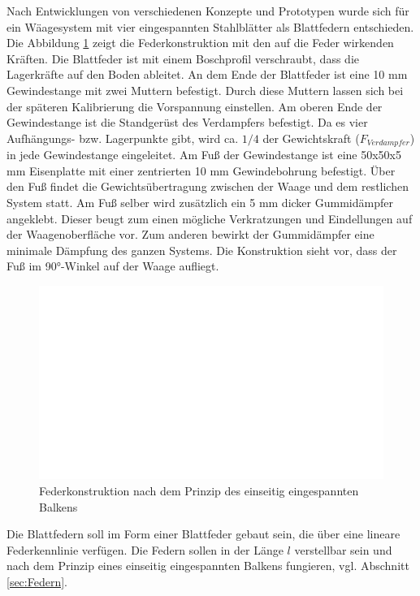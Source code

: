 Nach Entwicklungen von verschiedenen Konzepte und Prototypen wurde sich für ein Wäagesystem mit vier eingespannten Stahlblätter als Blattfedern entschieden.  Die Abbildung \ref{fig:Feder} zeigt die Federkonstruktion mit den auf die Feder wirkenden Kräften. Die Blattfeder ist mit einem Boschprofil verschraubt, dass die Lagerkräfte auf den Boden ableitet. An dem Ende der Blattfeder ist eine 10 mm Gewindestange mit zwei Muttern befestigt. Durch diese Muttern lassen sich bei der späteren Kalibrierung die Vorspannung einstellen. Am oberen Ende der Gewindestange ist die Standgerüst des Verdampfers befestigt. Da es vier Aufhängungs- bzw. Lagerpunkte gibt, wird ca. $1/4$ der Gewichtskraft ($F_{Verdampfer}$) in jede Gewindestange eingeleitet. Am Fuß der Gewindestange ist eine 50x50x5 mm Eisenplatte mit einer zentrierten 10 mm Gewindebohrung befestigt. Über den Fuß findet die Gewichtsübertragung zwischen der Waage und dem restlichen System statt. Am Fuß selber wird zusätzlich ein 5 mm dicker Gummidämpfer angeklebt. Dieser beugt zum einen mögliche Verkratzungen und Eindellungen auf der Waagenoberfläche vor. Zum anderen bewirkt der Gummidämpfer eine minimale Dämpfung des ganzen Systems. Die Konstruktion sieht vor, dass der Fuß im 90$°$-Winkel auf der Waage aufliegt. 

\begin{figure}
\centering		\includegraphics[page=7,width=1.10\textwidth]{Pictures/Feder.pdf}
\caption{Federkonstruktion nach dem Prinzip des einseitig eingespannten Balkens}
\label{fig:Feder}
\end{figure}






Die Blattfedern soll im Form einer Blattfeder gebaut sein, die über eine lineare Federkennlinie verfügen. Die Federn sollen in der Länge $l$ verstellbar sein und nach dem Prinzip eines einseitig eingespannten Balkens fungieren, vgl. Abschnitt \ref{sec:Federn}. 

